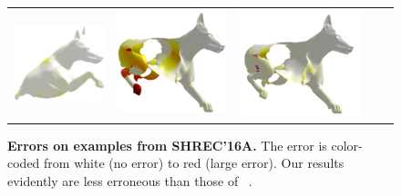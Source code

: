 \begin{figure}[h!]
\begin{tabular}[width=0.8\textwidth]{cc|ccc}
		\includegraphics[scale=0.5]{figures/cuts_dog_8_err.png} &  \includegraphics[scale=0.5]{figures/holes_dog_13_PFM_err.png}&   \includegraphics[scale=0.5]{figures/holes_dog_13_err.png}& \\
	\end{tabular}
	\caption{{\textbf {Errors on examples from SHREC'16A.}}
		The error is color-coded from white (no error) to red (large error).
		Our results evidently are less erroneous than those of ~\cite{rodola2017partial}.
	}
	\label{fig:Shrec16Qualitative-error}
	\end{figure}
	
